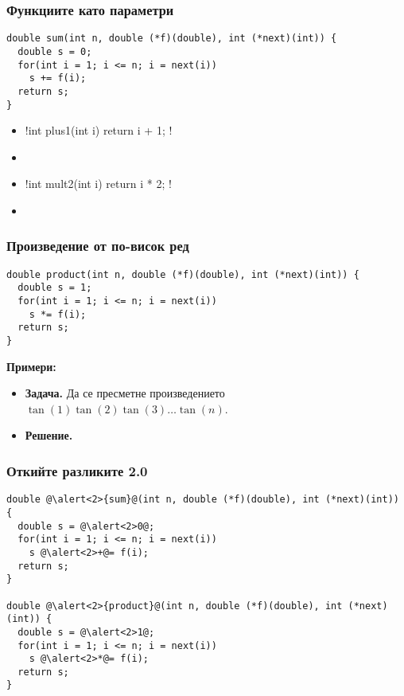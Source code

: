 \documentclass{beamer}
\begin{document}
\begin{frame}[fragile]
  \frametitle{Функциите като параметри}

\begin{lstlisting}
double sum(int n, double (*f)(double), int (*next)(int)) {
  double s = 0;
  for(int i = 1; i <= n; i = next(i))
    s += f(i);
  return s;
}
\end{lstlisting}
  \pause
  \begin{itemize}[<+->]
  \item \lst!int plus1(int i) { return i + 1; }!
  \item {} \eqv {}
  \item \lst!int mult2(int i) { return i * 2; }!
  \item {} \eqv {}
  \end{itemize}
\end{frame}

\begin{frame}[fragile]
  \frametitle{Произведение от по-висок ред}

\begin{lstlisting}
double product(int n, double (*f)(double), int (*next)(int)) {
  double s = 1;
  for(int i = 1; i <= n; i = next(i))
    s *= f(i);
  return s;
}
\end{lstlisting}
  \pause
  \textbf{Примери:}
  \begin{itemize}[<+->]
  \item \textbf{Задача.} Да се пресметне произведението $\tan(1)\tan(2)\tan(3)\ldots\tan(n)$.
  \item \textbf{Решение.} 
  \end{itemize}
\end{frame}

\begin{frame}[fragile]
  \frametitle{Откийте разликите 2.0}

\begin{lstlisting}
double @\alert<2>{sum}@(int n, double (*f)(double), int (*next)(int)) {
  double s = @\alert<2>0@;
  for(int i = 1; i <= n; i = next(i))
    s @\alert<2>+@= f(i);
  return s;
}

double @\alert<2>{product}@(int n, double (*f)(double), int (*next)(int)) {
  double s = @\alert<2>1@;
  for(int i = 1; i <= n; i = next(i))
    s @\alert<2>*@= f(i);
  return s;
}
\end{lstlisting}
\end{frame}
\end{document}
